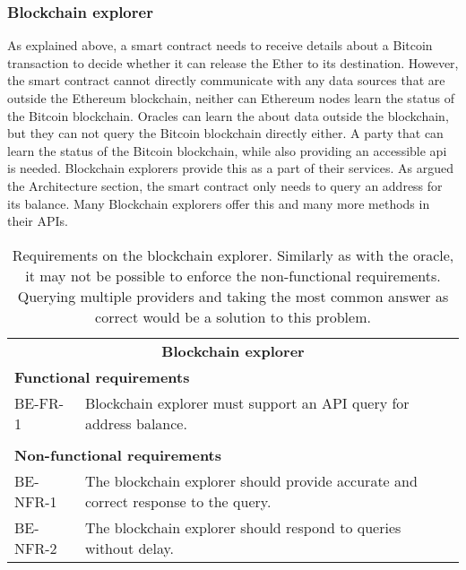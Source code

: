 \subsubsection{Blockchain explorer}
As explained above, a smart contract needs to receive details about a Bitcoin transaction to decide whether it can release the Ether to its destination. However, the smart contract cannot directly communicate with any data sources that are outside the Ethereum blockchain, neither can Ethereum nodes learn the status of the Bitcoin blockchain\footnotemark.
% 
% 
Oracles can learn the about data outside the blockchain, but they can not query the Bitcoin blockchain directly either\footnotemark. A party that can learn the status of the Bitcoin blockchain, while also providing an accessible \acrshort{api} is needed. Blockchain explorers provide this as a part of their services. As argued the Architecture section, the smart contract only needs to query an address for its balance. Many Blockchain explorers offer this and many more methods in their APIs.
% 
% 
\begin{table}[ht]
    \centering
    \begin{tabularx}{\textwidth}{|l X|}
    \hline
        \multicolumn{2}{|c|}{\textbf{Blockchain explorer}}\\
        \multicolumn{2}{|l|}{\textbf{Functional requirements}}\\
        BE-FR-1&Blockchain explorer must support an API query for address balance.\\
        &\\
        \multicolumn{2}{|l|}{\textbf{Non-functional requirements}}\\
        BE-NFR-1&The blockchain explorer should provide accurate and correct response to the query.\\
        BE-NFR-2&The blockchain explorer should respond to queries without delay.\\
    \hline
    \end{tabularx}
    \caption{Requirements on the blockchain explorer. Similarly as with the oracle, it may not be possible to enforce the non-functional requirements. Querying multiple providers and taking the most common answer as correct would be a solution to this problem.}
    \label{tab:reqs-block-explorer}
\end{table}

